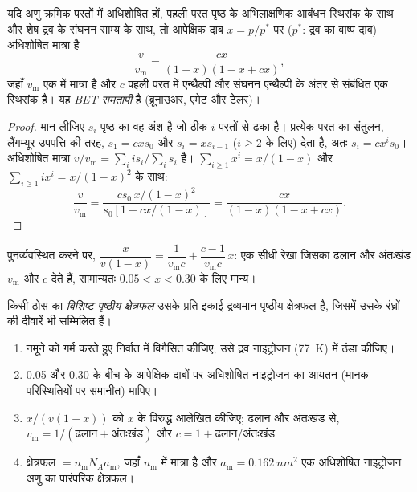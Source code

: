 \begin{theorem}\label{thm:b3:surfaces-catalysis:bet}
यदि अणु क्रमिक परतों में अधिशोषित हों, पहली परत पृष्ठ के अभिलाक्षणिक आबंधन स्थिरांक के साथ
और शेष द्रव के संघनन साम्य के साथ, तो
आपेक्षिक दाब $x = p/p^*$ पर ($p^*$: द्रव  का वाष्प
दाब) अधिशोषित मात्रा है
\[
  \frac{v}{v_{\mathrm m}} = \frac{cx}{(1 - x)(1 - x + cx)},
\]
जहाँ $v_{\mathrm m}$ एक  में मात्रा है और $c$ पहली परत में  एन्थैल्पी और
संघनन एन्थैल्पी के अंतर से संबंधित एक स्थिरांक है। यह \emph{BET समतापी} है (ब्रूनाउअर,
एमेट और टेलर)।
\end{theorem}

\begin{proof}
मान लीजिए $s_i$ पृष्ठ का वह अंश है जो ठीक $i$ परतों से ढका है।
प्रत्येक परत का संतुलन, लैंगम्यूर उपपत्ति की तरह, $s_1 = cxs_0$ और $s_i =
xs_{i-1}$ ($i \ge 2$ के लिए) देता है, अतः $s_i = cx^is_0$। अधिशोषित मात्रा $v/v_{\mathrm m} =
\sum_iis_i/\sum_is_i$ है। $\sum_{i\ge1}x^i = x/(1 - x)$ और $\sum_{i\ge1}ix^i = x/(1 - x)^2$ के साथ:
\[
  \frac{v}{v_{\mathrm m}} = \frac{cs_0\,x/(1 - x)^2}{s_0[1 + cx/(1 - x)]} = \frac{cx}{(1 - x)(1 - x + cx)} .
\]
\end{proof}

पुनर्व्यवस्थित करने पर, $\dfrac{x}{v(1 - x)} = \dfrac{1}{v_{\mathrm m}c} + \dfrac{c - 1}{v_{\mathrm m}c}\,x$: एक सीधी रेखा जिसका ढलान और
अंतःखंड $v_{\mathrm m}$ और $c$ देते हैं, सामान्यतः $0.05 < x < 0.30$ के लिए मान्य।

\begin{definition}[विशिष्ट पृष्ठीय क्षेत्रफल]\label{def:b3:surfaces-catalysis:surface-area}
किसी ठोस का \emph{विशिष्ट पृष्ठीय क्षेत्रफल} उसके
प्रति इकाई द्रव्यमान पृष्ठीय क्षेत्रफल है, जिसमें उसके रंध्रों की दीवारें भी सम्मिलित हैं।
\end{definition}

\begin{method}\label{met:b3:surfaces-catalysis:bet-area}
\begin{enumerate}
  \item नमूने को गर्म करते हुए निर्वात में विगैसित कीजिए; उसे द्रव नाइट्रोजन
        (\qty{77}{K}) में ठंडा कीजिए।
  \item 0.05 और 0.30 के बीच के आपेक्षिक दाबों पर अधिशोषित नाइट्रोजन का आयतन
        (मानक परिस्थितियों पर समानीत) मापिए।
  \item $x/(v(1 - x))$ को $x$ के विरुद्ध आलेखित कीजिए; ढलान और अंतःखंड से,
        $v_{\mathrm m} = 1/(\text{ढलान} + \text{अंतःखंड})$ और $c = 1 + \text{ढलान}/\text{अंतःखंड}$।
  \item क्षेत्रफल $= n_{\mathrm m}N_Aa_{\mathrm m}$, जहाँ $n_{\mathrm m}$  में मात्रा है और $a_{\mathrm m} = \qty{0.162}{nm^2}$
        एक अधिशोषित नाइट्रोजन अणु का पारंपरिक क्षेत्रफल।
\end{enumerate}
\end{method}

